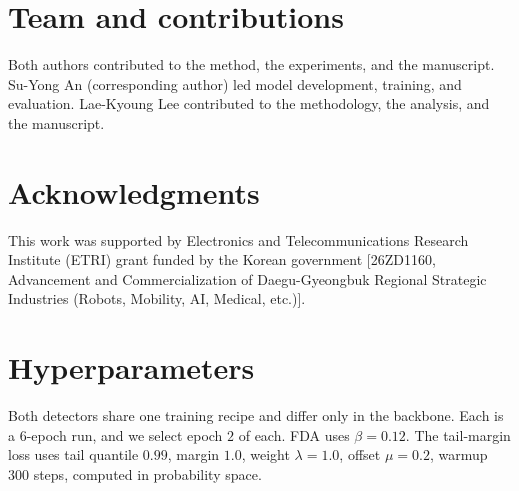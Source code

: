 \documentclass[11pt,a4paper]{article}
\begin{document}
\section{Team and contributions}
\label{sec:team}
Both authors contributed to the method, the experiments, and the manuscript. Su-Yong An (corresponding
author) led model development, training, and evaluation. Lae-Kyoung Lee contributed to the methodology, the
analysis, and the manuscript.

\section*{Acknowledgments}
This work was supported by Electronics and Telecommunications Research Institute (ETRI) grant funded by the
Korean government [26ZD1160, Advancement and Commercialization of Daegu-Gyeongbuk Regional Strategic
Industries (Robots, Mobility, AI, Medical, etc.)].




\appendix
\section{Hyperparameters}
\label{app:hparams}
Both detectors share one training recipe and differ only in the backbone. Each is a $6$-epoch run, and we
select epoch $2$ of each. FDA uses $\beta=0.12$. The tail-margin loss uses tail quantile $0.99$, margin
$1.0$, weight $\lambda=1.0$, offset $\mu=0.2$, warmup $300$ steps, computed in probability space.
\end{document}

